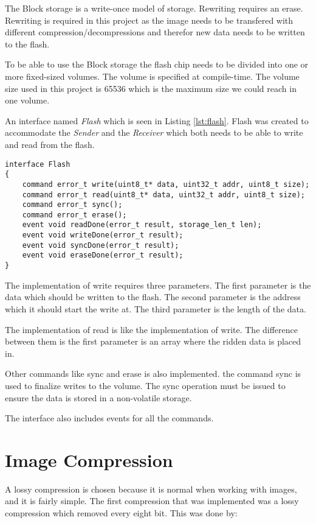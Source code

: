 The Block storage is a write-once model of storage. Rewriting requires an erase. Rewriting is required in this project as the image needs to be transfered with different compression/decompressions and therefor new data needs to be written to the flash.

To be able to use the Block storage the flash chip needs to be divided into one or more fixed-sized volumes. The volume is specified at compile-time. The volume size used in this project is 65536 which is the maximum size we could reach in one volume.

An interface named \emph{Flash} which is seen in Listing \ref{lst:flash}. Flash was created to accommodate the \emph{Sender} and the \emph{Receiver} which both needs to be able to write and read from the flash. 

\begin{lstlisting}[caption={The interface flash}, label=lst:flash]
interface Flash
{
	command error_t write(uint8_t* data, uint32_t addr, uint8_t size);
	command error_t read(uint8_t* data, uint32_t addr, uint8_t size);
	command error_t sync();
	command error_t erase();
	event void readDone(error_t result, storage_len_t len);
	event void writeDone(error_t result);
	event void syncDone(error_t result);
	event void eraseDone(error_t result);	
}
\end{lstlisting}

The implementation of write requires three parameters. The first parameter is the data which should be written to the flash. The second parameter is the address which it should start the write at. The third parameter is the length of the data. 

The implementation of read is like the implementation of write. The difference between them is the first parameter is an array where the ridden data is placed in. 

Other commands like sync and erase is also implemented. the command sync is used to finalize writes to the volume. The sync operation must be issued to ensure the data is stored in a non-volatile storage. 

The interface also includes events for all the commands. 

\section{Image Compression}
A lossy compression is chosen because it is normal when working with images, and it is fairly simple. The first compression that was implemented was a lossy compression which removed every eight bit. This was done by:

